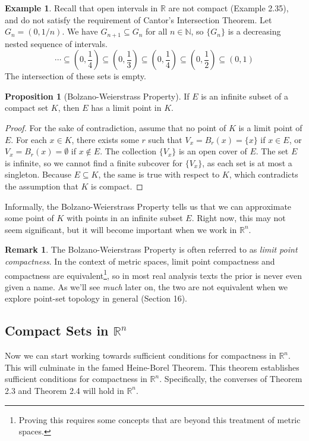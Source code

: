\documentclass{article}
\newcommand{\N}{\mathbb{N}}
\newcommand{\R}{\mathbb{R}}
\theoremstyle{definition}
\newtheorem{proposition}{Proposition}[section]
\newtheorem{example}{Example}[section]
\newtheorem{remark}{Remark}[section]
\begin{document}
	\begin{example}
		Recall that open intervals in $ \R $ are not compact (Example 2.35), and do not satisfy the requirement of Cantor's Intersection Theorem. Let $ G_{n}=(0,1/n) $. We have $ G_{n+1}\subseteq G_{n} $ for all $ n\in\N $, so $ \{G_n\} $ is a decreasing nested sequence of intervals. $$ \cdots\subseteq \left(0,\frac{1}{4}\right)\subseteq\left(0,\frac{1}{3}\right)\subseteq\left(0,\frac{1}{4}\right)\subseteq\left(0,\frac{1}{2}\right)\subseteq(0,1)$$  
		The intersection of these sets is empty.	
	\end{example}
	\begin{proposition}[Bolzano-Weierstrass Property]
		If $ E $ is an infinite subset of a compact set $ K $, then $ E $ has a limit point in $ K $. 
	\end{proposition}
	\begin{proof}
		For the sake of contradiction, assume that no point of $ K $ is a limit point of $ E $. For each $ x\in K $, there exists some $ r $ such that $ V_x=B_r(x)=\{x\}  $ if $ x\in E $, or $ V_x=B_r(x)=\emptyset $ if $ x\notin E $. The collection $ \{V_x\} $ is an open cover of $ E $. The set $ E $ is infinite, so we cannot find a finite subcover for $ \{V_x\} $, as each set is at most a singleton. Because $ E\subseteq K $, the same is true with respect to $ K $, which contradicts the assumption that $ K $ is compact. 
	\end{proof}
	Informally, the Bolzano-Weierstrass Property tells us that we can approximate some point of $ K $ with points in an infinite subset $ E $. Right now, this may not seem significant, but it will become important when we work in $ \R^n $. 
	\begin{remark}
		The Bolzano-Weierstrass Property is often referred to as \textit{\color{red}limit point compactness}. In the context of metric spaces, limit point compactness and compactness are equivalent\footnote{Proving this requires some concepts that are beyond this treatment of metric spaces.}, so in most real analysis texts the prior is never even given a name. As we'll see \textit{much} later on, the two are not equivalent when we explore point-set topology in general (Section 16).   
	\end{remark} 
	\subsection{Compact Sets in $ \R^n $}
	Now we can start working towards sufficient conditions for compactness in $ \R^n $. This will culminate in the famed Heine-Borel Theorem. This theorem establishes sufficient conditions for compactness in $ \R^n $. Specifically, the converses of Theorem 2.3 and Theorem 2.4 will hold in $ \R^n $.  
	
\end{document}

